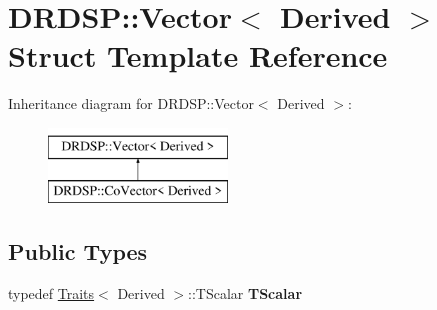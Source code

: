 \hypertarget{struct_d_r_d_s_p_1_1_vector}{\section{D\-R\-D\-S\-P\-:\-:Vector$<$ Derived $>$ Struct Template Reference}
\label{struct_d_r_d_s_p_1_1_vector}
}
Inheritance diagram for D\-R\-D\-S\-P\-:\-:Vector$<$ Derived $>$\-:\begin{figure}[H]
\begin{center}
\leavevmode
\includegraphics[height=2.000000cm]{struct_d_r_d_s_p_1_1_vector}
\end{center}
\end{figure}
\subsection*{Public Types}
\begin{DoxyCompactItemize}
\item 
\hypertarget{struct_d_r_d_s_p_1_1_vector_a579b48d72ce51c48a98e8bdd1d009782}{typedef \hyperlink{struct_d_r_d_s_p_1_1_traits}{Traits}$<$ Derived $>$\-::T\-Scalar {\bfseries T\-Scalar}}\label{struct_d_r_d_s_p_1_1_vector_a579b48d72ce51c48a98e8bdd1d009782}

\end{DoxyCompactItemize}
